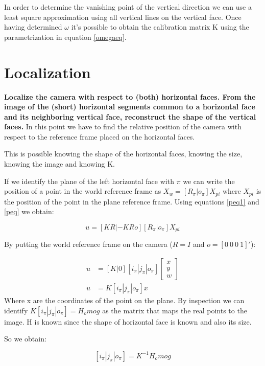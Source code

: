 \documentclass[11pt, oneside]{article}   	%
\begin{document}
In order to determine the vanishing point of the vertical direction we can use a least square approximation using all vertical lines on the vertical face.
Once having determined $\omega$ it's possible to obtain the calibration matrix K using the parametrization in equation \ref{omegaeq}. 

\section{Localization}
\textbf{ Localize the camera with respect to (both) horizontal faces. From the image of the (short) horizontal segments common to a horizontal face and its neighboring vertical face, reconstruct the shape of the vertical faces.} \hfill \break
In this point we have to find the relative position of the camera with respect to the reference frame placed on the horizontal faces.

This is possible knowing the shape of the horizontal faces, knowing the size, knowing the image and knowing K.

If we identify the plane of the left horizontal face with $\pi$ we can write the position of a point in the world reference frame as $ X_w =[R_{\pi} | o_{\pi}]X_{pi} $ where $X_{pi} $ is the position of the point in the plane reference frame. Using equations \ref{peq1} and \ref{peq} we obtain:

$$
u = [KR | -KRo] [R_{\pi} | o_{\pi}]X_{pi}
$$

By putting the world reference frame on the camera ($R=I$ and $o=[0 \ 0\ 0\ 1]'$):

\begin{subequations}
\begin{align*}
u  & = [K|0][i_\pi | j_\pi | o_\pi] \begin{bmatrix}
x \\ y \\ w
\end{bmatrix} \\
u & = K [i_\pi | j_\pi | o_\pi] x
\end{align*}
\end{subequations}
Where x are the coordinates of the point on the plane. 
By inspection we can identify $K [i_\pi | j_\pi | o_\pi] = H_omog$ as the matrix that maps the real points to the image. H is known since the shape of horizontal face is known and also its size.

So we obtain:

$$[i_\pi | j_\pi | o_\pi]= K^{-1}H_omog $$
\end{document}
